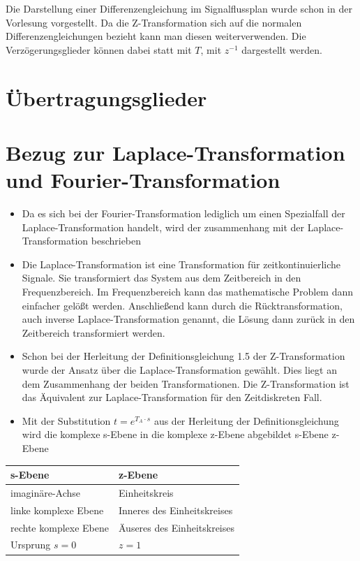 \documentclass[11pt]{article}
\begin{document}
Die Darstellung einer Differenzengleichung im Signalflussplan wurde
schon in der Vorlesung vorgestellt. Da die Z-Transformation sich auf die
normalen Differenzengleichungen bezieht kann man diesen weiterverwenden.
Die Verzögerungsglieder können dabei statt mit \(T\), mit \(z^{-1}\)
dargestellt werden.

    \section{Übertragungsglieder}\label{uxfcbertragungsglieder}

    \section{Bezug zur Laplace-Transformation und
Fourier-Transformation}\label{bezug-zur-laplace-transformation-und-fourier-transformation}

\begin{itemize}
\item
  Da es sich bei der Fourier-Transformation lediglich um einen
  Spezialfall der Laplace-Transformation handelt, wird der zusammenhang
  mit der Laplace-Transformation beschrieben
\item
  Die Laplace-Transformation ist eine Transformation für
  zeitkontinuierliche Signale. Sie transformiert das System aus dem
  Zeitbereich in den Frequenzbereich. Im Frequenzbereich kann das
  mathematische Problem dann einfacher gelößt werden. Anschließend kann
  durch die Rücktransformation, auch inverse Laplace-Transformation
  genannt, die Lösung dann zurück in den Zeitbereich transformiert
  werden.
\item
  Schon bei der Herleitung der Definitionsgleichung 1.5 der
  Z-Transformation wurde der Ansatz über die Laplace-Transformation
  gewählt. Dies liegt an dem Zusammenhang der beiden Transformationen.
  Die Z-Transformation ist das Äquivalent zur Laplace-Transformation für
  den Zeitdiskreten Fall.
\item
  Mit der Substitution \(t = e^{T_A \cdot s}\) aus der Herleitung der
  Definitionsgleichung wird die komplexe s-Ebene in die komplexe z-Ebene
  abgebildet s-Ebene z-Ebene
\end{itemize}

\begin{longtable}[]{@{}ll@{}}
\toprule
s-Ebene & z-Ebene\tabularnewline
\midrule
\endhead
imaginäre-Achse & Einheitskreis\tabularnewline
linke komplexe Ebene & Inneres des Einheitskreises\tabularnewline
rechte komplexe Ebene & Äuseres des Einheitskreises\tabularnewline
Ursprung \(s = 0\) & \(z = 1\)\tabularnewline
\bottomrule
\end{longtable}
\end{document}
